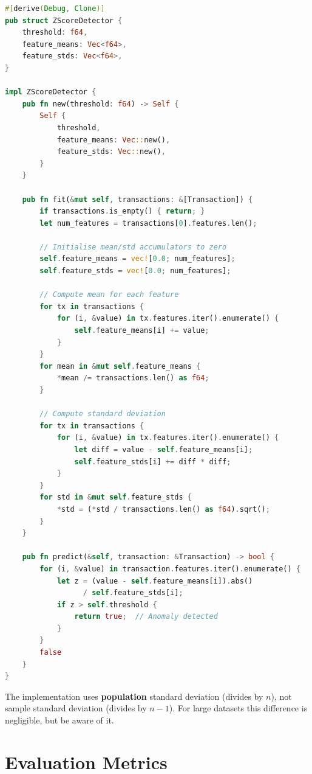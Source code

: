 \begin{lstlisting}[language=Rust]
#[derive(Debug, Clone)]
pub struct ZScoreDetector {
    threshold: f64,
    feature_means: Vec<f64>,
    feature_stds: Vec<f64>,
}

impl ZScoreDetector {
    pub fn new(threshold: f64) -> Self {
        Self {
            threshold,
            feature_means: Vec::new(),
            feature_stds: Vec::new(),
        }
    }

    pub fn fit(&mut self, transactions: &[Transaction]) {
        if transactions.is_empty() { return; }
        let num_features = transactions[0].features.len();

        // Initialise mean/std accumulators to zero
        self.feature_means = vec![0.0; num_features];
        self.feature_stds = vec![0.0; num_features];

        // Compute mean for each feature
        for tx in transactions {
            for (i, &value) in tx.features.iter().enumerate() {
                self.feature_means[i] += value;
            }
        }
        for mean in &mut self.feature_means {
            *mean /= transactions.len() as f64;
        }

        // Compute standard deviation
        for tx in transactions {
            for (i, &value) in tx.features.iter().enumerate() {
                let diff = value - self.feature_means[i];
                self.feature_stds[i] += diff * diff;
            }
        }
        for std in &mut self.feature_stds {
            *std = (*std / transactions.len() as f64).sqrt();
        }
    }

    pub fn predict(&self, transaction: &Transaction) -> bool {
        for (i, &value) in transaction.features.iter().enumerate() {
            let z = (value - self.feature_means[i]).abs()
                  / self.feature_stds[i];
            if z > self.threshold {
                return true;  // Anomaly detected
            }
        }
        false
    }
}
\end{lstlisting}

\begin{warning}
The implementation uses \textbf{population} standard deviation (divides by $n$), not sample standard deviation (divides by $n-1$). For large datasets this difference is negligible, but be aware of it.
\end{warning}

\section{Evaluation Metrics}

